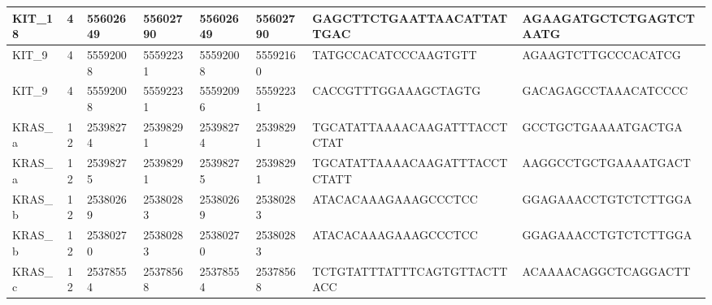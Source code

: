 \begin{landscape}
\begin{longtable}{| p{} | p{} | p{} | p{} | p{} | p{} | p{} | p{} |}
\multicolumn{1}{|l|}{KIT\_18}    & \multicolumn{1}{c|}{4}  & \multicolumn{1}{l|}{55602649}  & \multicolumn{1}{l|}{55602790}  & \multicolumn{1}{l|}{55602649}  & \multicolumn{1}{l|}{55602790}  & \multicolumn{1}{l|}{GAGCTTCTGAATTAACATTATTGAC}       & \multicolumn{1}{l|}{AGAAGATGCTCTGAGTCTAATG}        \\ \hline
\multicolumn{1}{|l|}{KIT\_9}     & \multicolumn{1}{c|}{4}  & \multicolumn{1}{l|}{55592008}  & \multicolumn{1}{l|}{55592231}  & \multicolumn{1}{l|}{55592008}  & \multicolumn{1}{l|}{55592160}  & \multicolumn{1}{l|}{TATGCCACATCCCAAGTGTT}            & \multicolumn{1}{l|}{AGAAGTCTTGCCCACATCG}           \\ \hline
\multicolumn{1}{|l|}{KIT\_9}     & \multicolumn{1}{c|}{4}  & \multicolumn{1}{l|}{55592008}  & \multicolumn{1}{l|}{55592231}  & \multicolumn{1}{l|}{55592096}  & \multicolumn{1}{l|}{55592231}  & \multicolumn{1}{l|}{CACCGTTTGGAAAGCTAGTG}            & \multicolumn{1}{l|}{GACAGAGCCTAAACATCCCC}          \\ \hline
\multicolumn{1}{|l|}{KRAS\_a}    & \multicolumn{1}{c|}{12} & \multicolumn{1}{l|}{25398274}  & \multicolumn{1}{l|}{25398291}  & \multicolumn{1}{l|}{25398274}  & \multicolumn{1}{l|}{25398291}  & \multicolumn{1}{l|}{TGCATATTAAAACAAGATTTACCTCTAT}    & \multicolumn{1}{l|}{GCCTGCTGAAAATGACTGA}           \\ \hline
\multicolumn{1}{|l|}{KRAS\_a}    & \multicolumn{1}{c|}{12} & \multicolumn{1}{l|}{25398275}  & \multicolumn{1}{l|}{25398291}  & \multicolumn{1}{l|}{25398275}  & \multicolumn{1}{l|}{25398291}  & \multicolumn{1}{l|}{TGCATATTAAAACAAGATTTACCTCTATT}   & \multicolumn{1}{l|}{AAGGCCTGCTGAAAATGACT}          \\ \hline
\multicolumn{1}{|l|}{KRAS\_b}    & \multicolumn{1}{c|}{12} & \multicolumn{1}{l|}{25380269}  & \multicolumn{1}{l|}{25380283}  & \multicolumn{1}{l|}{25380269}  & \multicolumn{1}{l|}{25380283}  & \multicolumn{1}{l|}{ATACACAAAGAAAGCCCTCC}            & \multicolumn{1}{l|}{GGAGAAACCTGTCTCTTGGA}          \\ \hline
\multicolumn{1}{|l|}{KRAS\_b}    & \multicolumn{1}{c|}{12} & \multicolumn{1}{l|}{25380270}  & \multicolumn{1}{l|}{25380283}  & \multicolumn{1}{l|}{25380270}  & \multicolumn{1}{l|}{25380283}  & \multicolumn{1}{l|}{ATACACAAAGAAAGCCCTCC}            & \multicolumn{1}{l|}{GGAGAAACCTGTCTCTTGGA}          \\ \hline
\multicolumn{1}{|l|}{KRAS\_c}    & \multicolumn{1}{c|}{12} & \multicolumn{1}{l|}{25378554}  & \multicolumn{1}{l|}{25378568}  & \multicolumn{1}{l|}{25378554}  & \multicolumn{1}{l|}{25378568}  & \multicolumn{1}{l|}{TCTGTATTTATTTCAGTGTTACTTACC}     & \multicolumn{1}{l|}{ACAAAACAGGCTCAGGACTT}          \\ \hline

\end{longtable}
\end{landscape}
